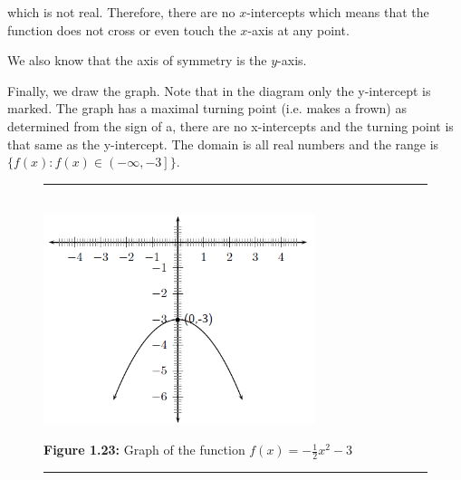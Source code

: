           
          \label{m39345*id245588}which is not real. Therefore, there are no \begin{math}x\end{math}-intercepts which means that the function does not cross or even touch the \begin{math}x\end{math}-axis at any point.\par 
          \label{m39345*id245613}We also know that the axis of symmetry is the \begin{math}y\end{math}-axis.\par 
          \label{m39345*eip-782}Finally, we draw the graph. Note that in the diagram only the y-intercept is marked. The graph has a maximal turning point (i.e. makes a frown) as determined from the sign of a, there are no x-intercepts and the turning point is that same as the y-intercept. The domain is all real numbers and the range is \begin{math}\{f\left(x\right):f\left(x\right)\in \left(-\infty ,-3\right]\}\end{math}.\par 
    \setcounter{subfigure}{0}


	\begin{figure}[H] %
    \begin{center}
    \rule[.1in]{\figurerulewidth}{.005in} \\
        \label{m39345*uid129!!!underscore!!!media}\label{m39345*uid129!!!underscore!!!printimage}\includegraphics[width=300px]{col11306.imgs/m39345_MG10C11_019.png} %
        
      \vspace{2pt}
    \vspace{\rubberspace}\par \begin{cnxcaption}
	  \small \textbf{Figure 1.23: }Graph of the function \begin{math}f\left(x\right)=-\frac{1}{2}{x}^{2}-3\end{math}
	\end{cnxcaption}
      
    \vspace{.1in}
    \rule[.1in]{\figurerulewidth}{.005in} \\
        
    \end{center}

 \end{figure}   

